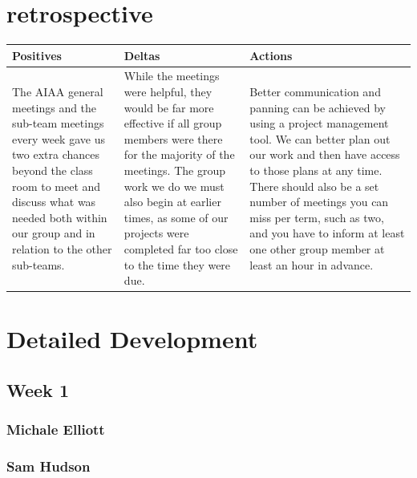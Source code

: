 \documentclass[onecolumn, draftclsnofoot,10pt, compsoc]{IEEEtran}
\begin{document}
\section {retrospective}
\begin {center}
 \begin {tabular} { | p{5cm} | p{5cm} | p{5cm} | }
 \hline
 Positives & Deltas & Actions \\
 \hline
 The AIAA general meetings and the sub-team meetings every week gave us two extra chances beyond the class room to meet and discuss what was needed both within our group and in relation to the other sub-teams. & While the meetings were helpful, they would be far more effective if all group members were there for the majority of the meetings. The group work we do we must also begin at earlier times, as some of our projects were completed far too close to the time they were due. & Better communication and panning can be achieved by using a project management tool. We can better plan out our work and then have access to those plans at any time. There should also be a set number of meetings you can miss per term, such as two, and you have to inform at least one other group member at least an hour in advance. \\
 \hline
 \end {tabular}
\end {center} 
\section {Detailed Development}
\subsection {Week 1}
\subsubsection{Michale Elliott}
\subsubsection{Sam Hudson}
\end{document}

